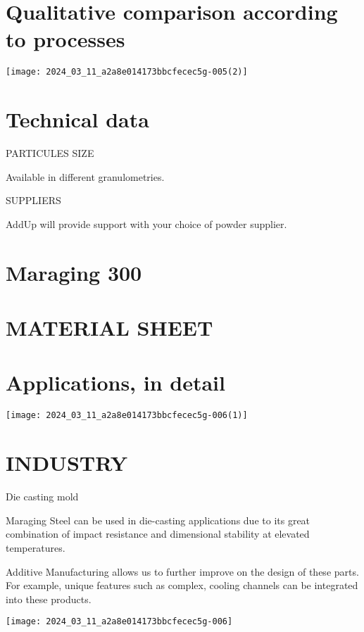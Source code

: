 \documentclass[10pt]{article}
\begin{document}
\section*{Qualitative comparison according to processes}
\begin{center}
\texttt{[image: 2024\_03\_11\_a2a8e014173bbcfecec5g-005(2)]}
\end{center}

\section*{Technical data}
PARTICULES SIZE

Available in different granulometries.

SUPPLIERS

AddUp will provide support with your choice of powder supplier.

\section*{Maraging 300}
\section*{MATERIAL SHEET}
\section*{Applications, in detail}
\begin{center}
\texttt{[image: 2024\_03\_11\_a2a8e014173bbcfecec5g-006(1)]}
\end{center}

\section*{INDUSTRY}
Die casting mold

Maraging Steel can be used in die-casting applications due to its great combination of impact resistance and dimensional stability at elevated temperatures.

Additive Manufacturing allows us to further improve on the design of these parts. For example, unique features such as complex, cooling channels can be integrated into these products.

\begin{center}
\texttt{[image: 2024\_03\_11\_a2a8e014173bbcfecec5g-006]}
\end{center}
\end{document}
